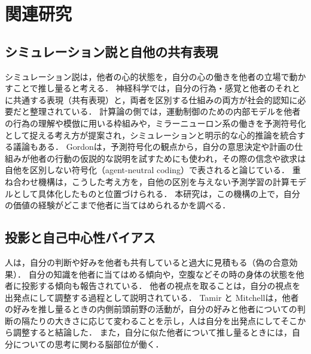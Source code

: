 \section{関連研究}\label{sec:related}

\subsection{シミュレーション説と自他の共有表現}\label{sec:related-st}
シミュレーション説は，他者の心的状態を，自分の心の働きを他者の立場で動かすことで推し量ると考える\cite{gordon1986folk,goldman2006simulating}．
神経科学では，自分の行為・感覚と他者のそれとに共通する表現（共有表現）と，両者を区別する仕組みの両方が社会的認知に必要だと整理されている\cite{decety2003shared}．
計算論の側では，運動制御のための内部モデルを他者の行為の理解や模倣に用いる枠組み\cite{wolpert2003unifying}や，ミラーニューロン系の働きを予測符号化として捉える考え方\cite{kilner2007predictive}が提案され，シミュレーションと明示的な心的推論を統合する議論もある\cite{keysers2007integrating}．
Gordon\cite{gordon2021simulation}は，予測符号化の観点から，自分の意思決定や計画の仕組みが他者の行動の仮説的な説明を試すためにも使われ，その際の信念や欲求は自他を区別しない符号化（agent-neutral coding）で表されると論じている．
重ね合わせ機構\cite{noguchi2022superposition}は，こうした考え方を，自他の区別を与えない予測学習の計算モデルとして具体化したものと位置づけられる．
本研究は，この機構の上で，自分の価値の経験がどこまで他者に当てはめられるかを調べる．

\subsection{投影と自己中心性バイアス}\label{sec:related-projection}
人は，自分の判断や好みを他者も共有していると過大に見積もる（偽の合意効果\cite{ross1977false}）．
自分の知識を他者に当てはめる傾向\cite{nickerson1999how}や，空腹などその時の身体の状態を他者に投影する傾向\cite{vanboven2003social}も報告されている．
他者の視点を取ることは，自分の視点を出発点にして調整する過程として説明されている\cite{epley2004perspective}．
Tamir と Mitchell\cite{tamir2010neural}は，他者の好みを推し量るときの内側前頭前野の活動が，自分の好みと他者についての判断の隔たりの大きさに応じて変わることを示し，人は自分を出発点にしてそこから調整すると結論した．
また，自分に似た他者について推し量るときには，自分についての思考に関わる脳部位が働く\cite{mitchell2006dissociable}．

